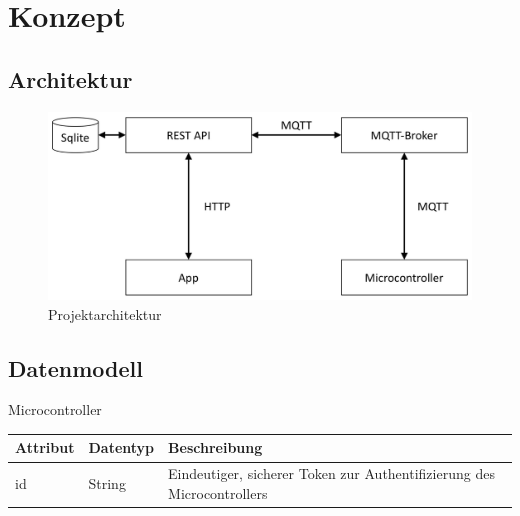 \section{Konzept}

    \subsection{Architektur}
    \begin{figure}[H]
        \centering
        \includegraphics[width=0.7\linewidth]{../Pictures/Konzept/Architecture}
        \caption{Projektarchitektur}
        \label{fig:architecture}
    \end{figure}
    
    \subsection{Datenmodell}
    
     \begin{minipage}{\textwidth}
        Microcontroller\\
        \begin{tabularx}{\linewidth}{|l|l|X|}
            \hline
            Attribut & Datentyp & Beschreibung\\
            \hline
            id & String & Eindeutiger, sicherer Token zur Authentifizierung des Microcontrollers \\
            \hline                              
        \end{tabularx}
    \end{minipage}

\vspace{0.5cm}

